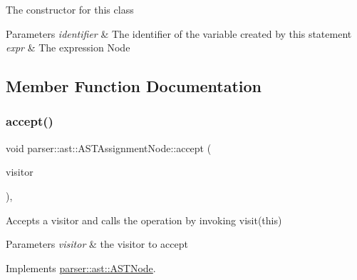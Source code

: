 The constructor for this class 
\begin{DoxyParams}{Parameters}
{\em identifier} & The identifier of the variable created by this statement \\
\hline
{\em expr} & The expression Node \\
\hline
\end{DoxyParams}


\subsection{Member Function Documentation}
\mbox{\label{classparser_1_1ast_1_1ASTAssignmentNode_abfbf5dd90191738f1faea1334fe8480b}} 
\subsubsection{\texorpdfstring{accept()}{accept()}}
{\footnotesize\ttfamily void parser\+::ast\+::\+A\+S\+T\+Assignment\+Node\+::accept (\begin{DoxyParamCaption}\item[{\hyperlink{classvisitor_1_1Visitor}{visitor\+::\+Visitor} $\ast$}]{visitor }\end{DoxyParamCaption})\hspace{0.3cm}{\ttfamily [override]}, {\ttfamily [virtual]}}

Accepts a visitor and calls the operation by invoking {\ttfamily visit(this)} 
\begin{DoxyParams}{Parameters}
{\em visitor} & the visitor to accept \\
\hline
\end{DoxyParams}


Implements \hyperlink{classparser_1_1ast_1_1ASTNode_a3ff84fdfdbbc5c39b70b4d04c22e7dc3}{parser\+::ast\+::\+A\+S\+T\+Node}.

\mbox{\label{classparser_1_1ast_1_1ASTAssignmentNode_a0610348cf9d4f3302320ebd6598e45e2}} 
